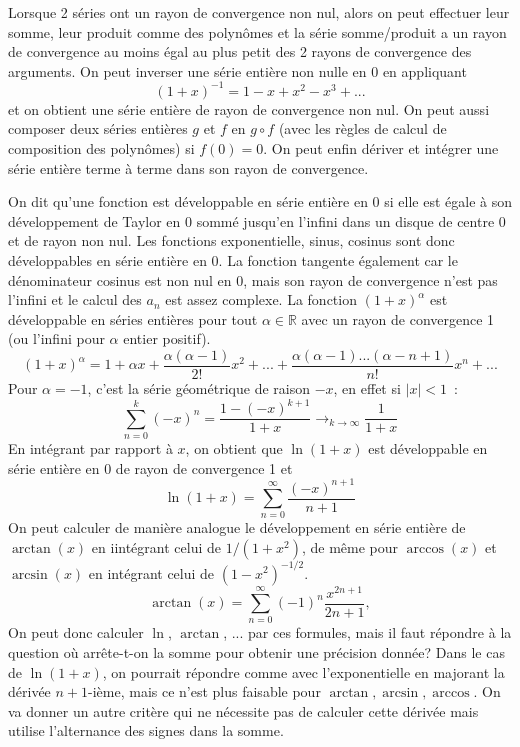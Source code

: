 \documentclass[a4paper,11pt]{article}
\newcommand{\R}{{\mathbb{R}}}
\begin{document}
Lorsque 2 séries ont un rayon de convergence non nul, alors on
peut effectuer leur somme, leur produit comme des polynômes et la
série somme/produit a un rayon de convergence au moins égal au plus
petit des 2 rayons de convergence des arguments. On peut inverser une série
entière non nulle en 0 en appliquant 
\[ (1+x)^{-1} = 1-x+x^2-x^3+... \]
et on obtient une série entière de rayon de
convergence non nul. On peut aussi composer deux séries entières
$g$ et $f$ en $g\circ f$ (avec les r\`egles de calcul de composition
des polyn\^omes) si $f(0)=0$. On peut enfin dériver
et intégrer une série entière terme à terme dans son rayon de convergence.

On dit qu'une fonction est développable en série entière en 0 si
elle est égale à son développement de Taylor en 0 sommé jusqu'en l'infini
dans un disque de centre 0 et de rayon non nul. Les fonctions
exponentielle, sinus, cosinus sont donc développables en série entière en 0.
La fonction tangente également car le dénominateur cosinus est non nul en 0,
mais son rayon de convergence n'est pas l'infini et le calcul des $a_n$
est assez complexe.
La fonction $(1+x)^\alpha$ est développable en séries entières
pour tout $\alpha \in \R$ avec un rayon de convergence 1 (ou l'infini
pour $\alpha $ entier positif). 
\[ (1+x)^\alpha = 1 + \alpha x + \frac{\alpha (\alpha-1)}{2!} x^2 +
... + \frac{\alpha (\alpha-1) ... (\alpha -n +1)}{n!} x^n + ...\]
Pour $\alpha=-1$, c'est la série 
géométrique de raison $-x$, en effet si $|x|<1$~:
\[ \sum_{n=0}^k (-x)^n = \frac{1-(-x)^{k+1}}{1+x} 
\rightarrow_{k\rightarrow \infty} \frac{1}{1+x}
\]
En intégrant par rapport à $x$, on obtient que $\ln(1+x)$ est développable
en série entière en 0 de rayon de convergence 1 et
\[ \ln(1+x) = \sum_{n=0}^\infty \frac{(-x)^{n+1}}{n+1} \]
On peut calculer de manière analogue le développement en série entière
de $\arctan(x)$ en iintégrant celui de $1/(1+x^2)$, de même pour $\arccos(x)$
et $\arcsin(x)$ en intégrant celui de $(1-x^2)^{-1/2}$.
\[ \arctan(x)=\sum_{n=0}^\infty (-1)^{n} \frac{x^{2n+1}}{2n+1},
\]
On peut donc calculer $\ln$, $\arctan$, ... par ces formules, 
mais il faut répondre
à la question où arrête-t-on la somme pour obtenir une précision donnée? 
Dans le cas de $\ln(1+x)$,
on pourrait répondre comme avec l'exponentielle en majorant la dérivée
$n+1$-ième, mais ce n'est plus faisable pour $\arctan, \arcsin, \arccos$.
On va donner un autre critère qui ne nécessite pas
de calculer cette dérivée mais utilise l'alternance des signes
dans la somme.
\end{document}
